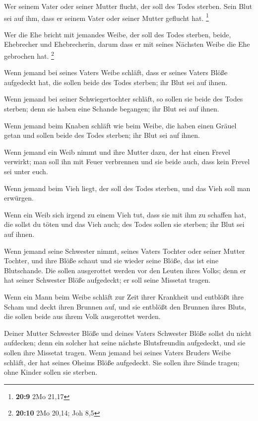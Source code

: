  Wer seinem Vater oder seiner Mutter flucht, der soll des
Todes sterben. Sein Blut sei auf ihm, dass er seinem Vater oder seiner
Mutter geflucht hat. \footnote{\textbf{20:9} 2Mo 21,17}

 Wer die Ehe bricht mit jemandes Weibe, der soll des
Todes sterben, beide, Ehebrecher und Ehebrecherin, darum dass er mit
seines Nächsten Weibe die Ehe gebrochen hat. \footnote{\textbf{20:10}
  2Mo 20,14; Joh 8,5}

 Wenn jemand bei seines Vaters Weibe schläft, dass er
seines Vaters Blöße aufgedeckt hat, die sollen beide des Todes sterben;
ihr Blut sei auf ihnen.

 Wenn jemand bei seiner Schwiegertochter schläft, so
sollen sie beide des Todes sterben; denn sie haben eine Schande
begangen; ihr Blut sei auf ihnen.

 Wenn jemand beim Knaben schläft wie beim Weibe, die
haben einen Gräuel getan und sollen beide des Todes sterben; ihr Blut
sei auf ihnen.

 Wenn jemand ein Weib nimmt und ihre Mutter dazu, der hat
einen Frevel verwirkt; man soll ihn mit Feuer verbrennen und sie beide
auch, dass kein Frevel sei unter euch.

 Wenn jemand beim Vieh liegt, der soll des Todes sterben,
und das Vieh soll man erwürgen.

 Wenn ein Weib sich irgend zu einem Vieh tut, dass sie
mit ihm zu schaffen hat, die sollst du töten und das Vieh auch; des
Todes sollen sie sterben; ihr Blut sei auf ihnen.

 Wenn jemand seine Schwester nimmt, seines Vaters Tochter
oder seiner Mutter Tochter, und ihre Blöße schaut und sie wieder seine
Blöße, das ist eine Blutschande. Die sollen ausgerottet werden vor den
Leuten ihres Volks; denn er hat seiner Schwester Blöße aufgedeckt; er
soll seine Missetat tragen.

 Wenn ein Mann beim Weibe schläft zur Zeit ihrer
Krankheit und entblößt ihre Scham und deckt ihren Brunnen auf, und sie
entblößt den Brunnen ihres Bluts, die sollen beide aus ihrem Volk
ausgerottet werden.

 Deiner Mutter Schwester Blöße und deines Vaters
Schwester Blöße sollst du nicht aufdecken; denn ein solcher hat seine
nächste Blutsfreundin aufgedeckt, und sie sollen ihre Missetat tragen.
 Wenn jemand bei seines Vaters Bruders Weibe schläft, der
hat seines Oheims Blöße aufgedeckt. Sie sollen ihre Sünde tragen; ohne
Kinder sollen sie sterben.

